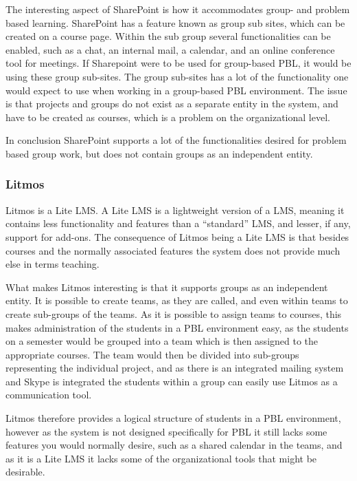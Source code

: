 The interesting aspect of SharePoint is how it accommodates group- and problem based learning. 
SharePoint has a feature known as group sub sites, which can be created on a course page.
Within the sub group several functionalities can be enabled, such as a chat, an internal mail, a calendar, and an online conference tool for meetings.
If Sharepoint were to be used for group-based PBL, it would be using these group sub-sites.
The group sub-sites has a lot of the functionality one would expect to use when working in a group-based PBL environment.
The issue is that projects and groups do not exist as a separate entity in the system, and have to be created as courses, which is a problem on the organizational level.

In conclusion SharePoint supports a lot of the functionalities desired for problem based group work, but does not contain groups as an independent entity.

\subsubsection{Litmos}
Litmos\citep{litmos} is a Lite LMS.
A Lite LMS is a lightweight version of a LMS, meaning it contains less functionality and features than a ``standard'' LMS, and lesser, if any, support for add-ons.
The consequence of Litmos being a Lite LMS is that besides courses and the normally associated features the system does not provide much else in terms teaching.

What makes Litmos interesting is that it supports groups as an independent entity.
It is possible to create teams, as they are called, and even within teams to create sub-groups of the teams.
As it is possible to assign teams to courses, this makes administration of the students in a PBL environment easy, as the students on a semester would be grouped into a team which is then assigned to the appropriate courses.
The team would then be divided into sub-groups representing the individual project, and as there is an integrated mailing system and Skype is integrated the students within a group can easily use Litmos as a communication tool. 

Litmos therefore provides a logical structure of students in a PBL environment, however as the system is not designed specifically for PBL it still lacks some features you would normally desire, such as a shared calendar in the teams, and as it is a Lite LMS it lacks some of the organizational tools that might be desirable.


